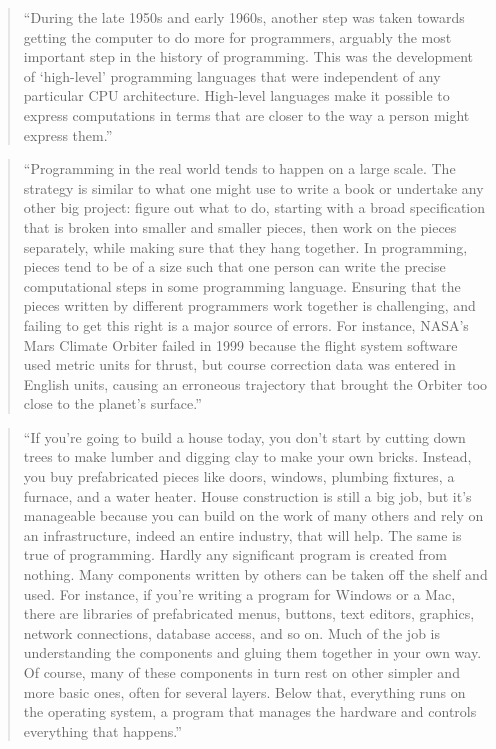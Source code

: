 \documentclass[]{tufte-book}
\begin{document}
\begin{quote}
``During the late 1950s and early 1960s, another step was taken towards getting the
computer to do more for programmers, arguably the most important step in the history of
programming. This was the development of `high-level' programming languages that were
independent of any particular CPU architecture. High-level languages make it possible to
express computations in terms that are closer to the way a person might express them.''
\citep{kernighan2011d}
\end{quote}

\begin{quote}
``Programming in the real world tends to happen on a large scale. The strategy is similar
to what one might use to write a book or undertake any other big project: figure out what
to do, starting with a broad specification that is broken into smaller and smaller pieces,
then work on the pieces separately, while making sure that they hang together. In programming,
pieces tend to be of a size such that one person can write the precise computational steps
in some programming language. Ensuring that the pieces written by different programmers
work together is challenging, and failing to get this right is a major source of errors.
For instance, NASA's Mars Climate Orbiter failed in 1999 because the flight system software
used metric units for thrust, but course correction data was entered in English units,
causing an erroneous trajectory that brought the Orbiter too close to the planet's
surface.'' \citep{kernighan2011d}
\end{quote}

\begin{quote}
``If you're going to build a house today, you don't start by cutting down trees to make
lumber and digging clay to make your own bricks. Instead, you buy prefabricated pieces like
doors, windows, plumbing fixtures, a furnace, and a water heater. House construction is still
a big job, but it's manageable because you can build on the work of many others and rely
on an infrastructure, indeed an entire industry, that will help. The same is true of
programming. Hardly any significant program is created from nothing. Many components written
by others can be taken off the shelf and used. For instance, if you're writing a program for
Windows or a Mac, there are libraries of prefabricated menus, buttons, text editors, graphics,
network connections, database access, and so on. Much of the job is understanding the components
and gluing them together in your own way. Of course, many of these components in turn rest on
other simpler and more basic ones, often for several layers. Below that, everything runs on
the operating system, a program that manages the hardware and controls everything that happens.''
\citep{kernighan2011d}
\end{quote}
\end{document}
